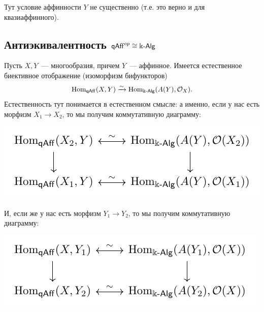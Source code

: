 	    \begin{remark}
	    	Тут условие аффинности $Y$ не существенно (т.е. это верно и для квазиаффинного). 
	    \end{remark}

	    \subsection{Антиэкивалентность $\mathsf{qAff}^{op} \cong \Bbbk\text{-}\mathsf{Alg}$}\hypertarget{bilet_6}{}


	    \begin{statement}\label{eq_cat_var} 
	    	Пусть $X, Y$~--- многообразия, причем $Y$~--- аффинное. Имеется естественное биективное отображение (изоморфизм бифункторов) 
	    	\[
	    		\operatorname{Hom}_{\mathsf{qAff}}(X, Y) \xrightarrow{\sim} \operatorname{Hom}_{\Bbbk\text{-}\mathsf{Alg}}(A(Y), \mathcal{O}_{X}).
	    	\]
	    	Естественность тут понимается в естественном смысле: а именно, если у нас есть морфизм $X_1 \to X_2$, то мы получим коммутативную диаграмму:

	    	\begin{center}
	    	\includegraphics{lectures/5/pictures/cd_2.pdf}
	    \end{center}

	    И, если же у нас есть морфизм $Y_1 \to Y_2$, то мы получим коммутативную диаграмму:  
	    \begin{center}
	    	\includegraphics{lectures/5/pictures/cd_3.pdf}
	    \end{center}

	    \end{statement}

